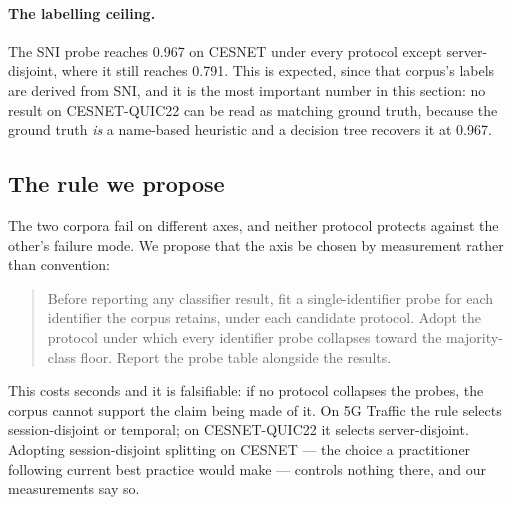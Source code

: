 \paragraph{The labelling ceiling.} The SNI probe reaches 0.967 on CESNET under
every protocol except server-disjoint, where it still reaches 0.791. This is
expected, since that corpus's labels are derived from SNI, and it is the most
important number in this section: no result on CESNET-QUIC22 can be read as
matching ground truth, because the ground truth \emph{is} a name-based
heuristic and a decision tree recovers it at 0.967.

\subsection{The rule we propose}

The two corpora fail on different axes, and neither protocol protects against
the other's failure mode. We propose that the axis be chosen by measurement
rather than convention:

\begin{quote}
Before reporting any classifier result, fit a single-identifier probe for each
identifier the corpus retains, under each candidate protocol. Adopt the
protocol under which every identifier probe collapses toward the majority-class
floor. Report the probe table alongside the results.
\end{quote}

This costs seconds and it is falsifiable: if no protocol collapses the probes,
the corpus cannot support the claim being made of it. On 5G Traffic the rule
selects session-disjoint or temporal; on CESNET-QUIC22 it selects
server-disjoint. Adopting session-disjoint splitting on CESNET --- the choice a
practitioner following current best practice would make --- controls nothing
there, and our measurements say so.
